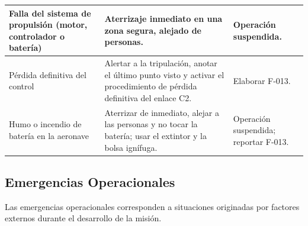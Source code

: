 \begin{longtable}{|p{4.5cm}|p{6cm}|p{3.5cm}|}
\\ \hline

Falla del sistema de propulsión (motor, controlador o batería) &
Aterrizaje inmediato en una zona segura, alejado de personas. &
Operación suspendida.

\\ \hline

Pérdida definitiva del control &
Alertar a la tripulación, anotar el último punto visto y activar el procedimiento de pérdida definitiva del enlace C2. &
Elaborar F-013.

\\ \hline

Humo o incendio de batería en la aeronave &
Aterrizar de inmediato, alejar a las personas y no tocar la batería; usar el extintor y la bolsa ignífuga. &
Operación suspendida; reportar F-013.

\\ \hline

\end{longtable}


\subsection{Emergencias Operacionales}

Las emergencias operacionales corresponden a situaciones originadas por factores externos durante el desarrollo de la misión.

\renewcommand{\arraystretch}{1.4}

